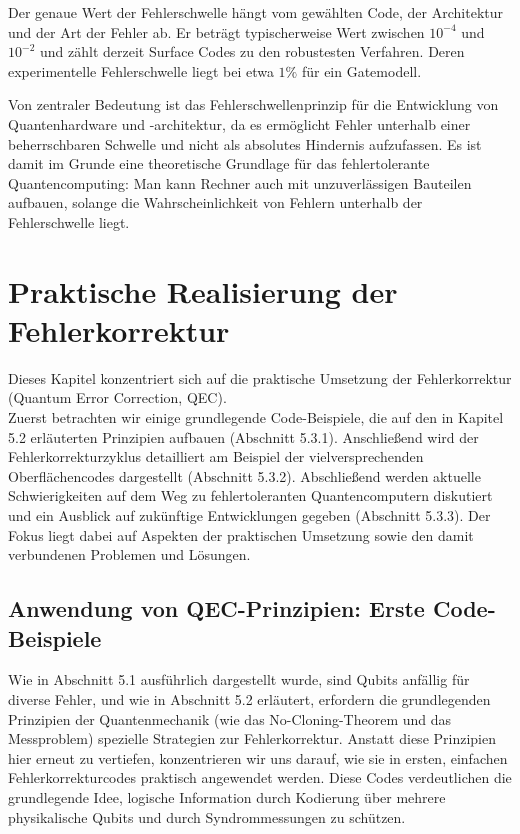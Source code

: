 Der genaue Wert der Fehlerschwelle hängt vom gewählten Code, der Architektur und der Art der Fehler ab. Er beträgt typischerweise  Wert zwischen \(\begin{equation}
    10^{-4}
\end{equation}\)  und \(\begin{equation}
    10^{-2}
\end{equation}\) und zählt derzeit Surface Codes zu den robustesten Verfahren. Deren experimentelle Fehlerschwelle liegt bei etwa \(\begin{equation}
    1 \%
\end{equation}\) für 
ein Gatemodell. \cite{Fowler et al.}

Von zentraler Bedeutung ist das Fehlerschwellenprinzip für die Entwicklung von Quantenhardware und -architektur, da es ermöglicht Fehler unterhalb einer beherrschbaren Schwelle und nicht als absolutes Hindernis aufzufassen. Es ist damit im Grunde eine theoretische Grundlage für das fehlertolerante Quantencomputing: Man kann Rechner auch mit unzuverlässigen Bauteilen aufbauen, solange die Wahrscheinlichkeit von Fehlern unterhalb der Fehlerschwelle liegt.

\section{Praktische Realisierung der Fehlerkorrektur}\label{chap:QEC3}

Dieses Kapitel konzentriert sich auf die praktische Umsetzung der Fehlerkorrektur (Quantum Error Correction, QEC).\\
Zuerst betrachten wir einige grundlegende Code-Beispiele, die auf den in Kapitel 5.2 erläuterten Prinzipien aufbauen (Abschnitt 5.3.1). Anschließend wird der Fehlerkorrekturzyklus detailliert am Beispiel der vielversprechenden Oberflächencodes dargestellt (Abschnitt 5.3.2). Abschließend werden aktuelle Schwierigkeiten auf dem Weg zu fehlertoleranten Quantencomputern diskutiert und ein Ausblick auf zukünftige Entwicklungen gegeben (Abschnitt 5.3.3). Der Fokus liegt dabei auf Aspekten der praktischen Umsetzung sowie den damit verbundenen Problemen und Lösungen.

\subsection{Anwendung von QEC-Prinzipien: Erste Code-Beispiele}

Wie in Abschnitt 5.1 ausführlich dargestellt wurde, sind Qubits anfällig für diverse Fehler, und wie in Abschnitt 5.2 erläutert, erfordern die grundlegenden Prinzipien der Quantenmechanik (wie das No-Cloning-Theorem und das Messproblem) spezielle Strategien zur Fehlerkorrektur. Anstatt diese Prinzipien hier erneut zu vertiefen, konzentrieren wir uns darauf, wie sie in ersten, einfachen Fehlerkorrekturcodes praktisch angewendet werden. Diese Codes verdeutlichen die grundlegende Idee, logische Information durch Kodierung über mehrere physikalische Qubits und durch Syndrommessungen zu schützen.

